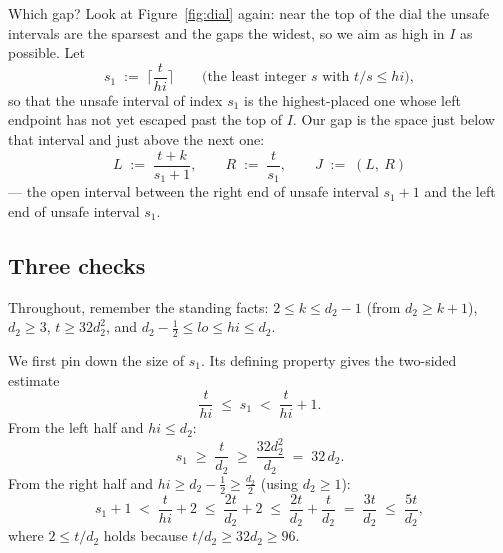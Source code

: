 \documentclass[11pt,reqno]{amsart}
\theoremstyle{plain}
\theoremstyle{definition}
\theoremstyle{remark}
\begin{document}
Which gap? Look at Figure~\ref{fig:dial} again: near the top of the dial the unsafe
intervals are the sparsest and the gaps the widest, so we aim as high in $I$ as
possible. Let
\[
  s_1 \;:=\; \Big\lceil \frac{t}{hi} \Big\rceil
  \qquad\text{(the least integer $s$ with } t/s \le hi\text{)} ,
\]
so that the unsafe interval of index $s_1$ is the highest-placed one whose left
endpoint has not yet escaped past the top of $I$. Our gap is the space just below
that interval and just above the next one:
\[
  L \;:=\; \frac{t+k}{s_1 + 1}, \qquad
  R \;:=\; \frac{t}{s_1}, \qquad
  J \;:=\; (L,\ R)
\]
--- the open interval between the right end of unsafe interval $s_1 + 1$ and the left
end of unsafe interval $s_1$.

\begin{center}
\end{center}

\subsection{Three checks}

Throughout, remember the standing facts: $2 \le k \le d_2 - 1$ (from
$d_2 \ge k+1$), $d_2 \ge 3$, $t \ge 32 d_2^2$, and $d_2 - \tfrac12 \le lo \le hi \le
d_2$.

We first pin down the size of $s_1$. Its defining property gives the two-sided
estimate
\begin{equation}\label{eq:s1-trap}
  \frac{t}{hi} \;\le\; s_1 \;<\; \frac{t}{hi} + 1 .
\end{equation}
From the left half and $hi \le d_2$:
\begin{equation}\label{eq:s1-lower}
  s_1 \;\ge\; \frac{t}{d_2} \;\ge\; \frac{32 d_2^2}{d_2} \;=\; 32\, d_2 .
\end{equation}
From the right half and $hi \ge d_2 - \tfrac12 \ge \tfrac{d_2}{2}$ (using $d_2 \ge
1$):
\begin{equation}\label{eq:s1-upper}
  s_1 + 1 \;<\; \frac{t}{hi} + 2 \;\le\; \frac{2t}{d_2} + 2
          \;\le\; \frac{2t}{d_2} + \frac{t}{d_2} \;=\; \frac{3t}{d_2}
          \;\le\; \frac{5t}{d_2} ,
\end{equation}
where $2 \le t/d_2$ holds because $t/d_2 \ge 32 d_2 \ge 96$.
\end{document}
